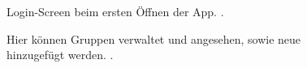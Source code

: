 \documentclass[parskip=full,11pt]{scrartcl}
\begin{document}

\begin{figure}[hb]
	\caption{\label{fig:menu}
		Login-Screen beim ersten Öffnen der App.
		 .
	}
\end{figure}

\begin{figure}[hb]
	\caption{\label{fig:groups}
		Hier können Gruppen verwaltet und angesehen, sowie neue hinzugefügt werden.
		.
	}
\end{figure}
\end{document}
